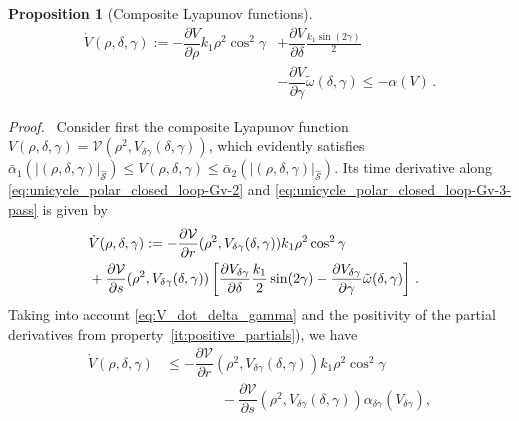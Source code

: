 \documentclass[journal,twoside,web]{ieeecolor}
\theoremstyle{definition}
\newtheorem{proposition}{Proposition}
\renewenvironment{proof}[1][Proof]{\par\pushQED{\qed}\normalfont\textit{#1.}~}{\popQED\par}
\begin{document}
\begin{proposition}[{Composite Lyapunov functions}]
\begin{equation}
\begin{aligned}
\dot{V}(\rho,\delta,\gamma) := 
-\dfrac{\partial V }{\partial \rho}%
k_1\rho^2\cos^2\gamma   %
&+ \dfrac{\partial V}{\partial \delta}
\frac{k_1 \sin(2\gamma)}{2} \\
&-\dfrac{\partial V}{\partial\gamma}\tilde\omega(\delta,\gamma) \nonumber
\leq -\alpha(V)\,. 
\end{aligned}
\label{eq:V_dot_rho_delta_gamma}
\end{equation}
\end{proposition}

\begin{proof}
Consider first the composite Lyapunov function $V(\rho,\delta,\gamma) = \mathcal{V}(\rho^2, V_{\delta \gamma}(\delta,\gamma))$, which evidently satisfies $ \bar\alpha_1(|(\rho,\delta, \gamma)|_{\hat{\mathcal{S}}}) \le V(\rho,\delta,\gamma) \le \bar\alpha_2(|(\rho,\delta, \gamma)|_{\hat{\mathcal{S}}})$. 
Its time derivative along \eqref{eq:unicycle_polar_closed_loop-Gv-2} and \eqref{eq:unicycle_polar_closed_loop-Gv-3-pass} is given by 
\begin{equation}
\hspace*{-0.32cm}
\begin{aligned}[b]
&\dot{V}(\rho,\delta,\gamma) := 
-\dfrac{\partial \mathcal{V} }{ \partial r}( \rho^2, V_{\delta \gamma}(\delta,\gamma))
k_1\rho^2\cos^2\gamma  \\ &+ \dfrac{\partial \mathcal{V}}{\partial s} ( \rho^2, V_{\delta \gamma}(\delta,\gamma))\left[\dfrac{\partial V_{\delta \gamma}}{\partial \delta}
\frac{k_1}{2} \sin(2\gamma) -\dfrac{\partial V_{\delta \gamma}}{\partial\gamma}\tilde\omega(\delta,\gamma) \right]\,. \label{eq:V_dot_rho_delta_gamma_1}
\end{aligned}
\end{equation}
Taking into account \eqref{eq:V_dot_delta_gamma} and the positivity of the partial derivatives from property~\ref{it:positive_partials}), we have 
\begin{align}
\dot{V}(\rho,\delta,\gamma) &\le -\dfrac{\partial \mathcal{V} }{ \partial r}( \rho^2, V_{\delta \gamma}(\delta,\gamma))
k_1\rho^2\cos^2\gamma\nonumber\\
&\qquad \qquad - \dfrac{\partial \mathcal{V}}{\partial s} ( \rho^2, V_{\delta \gamma}(\delta,\gamma)) \alpha_{\delta \gamma}(V_{\delta \gamma}), \label{eq:V_dot_rho_delta_gamma_1_upper_bound}

\end{align}
\end{proof}
\end{document}
